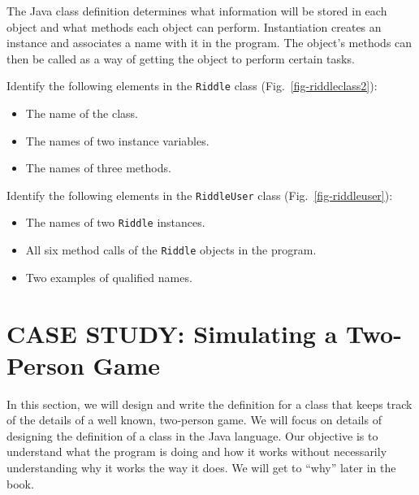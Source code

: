 \noindent The Java class definition determines what
information will be stored in each object and what methods each object
can perform.  Instantiation creates an instance and associates a name
with it in the program.  The object's methods can then be called as a
way of getting the object to perform certain tasks.

\pagebreak
{}
\label{self-study-exercises}
\begin{SSTUDY}

\item
Identify the following elements in the {\tt Riddle} class
(Fig.~\ref{fig-riddleclass2}):

\begin{itemize}
\item  The name of the class.
\item  The names of two instance variables.
\item  The names of three methods.
\end{itemize}


\item
Identify the following elements in the {\tt RiddleUser} class
(Fig.~\ref{fig-riddleuser}):

\begin{itemize}
\item  The names of two {\tt Riddle} instances.
\item  All six method calls of the {\tt Riddle} objects in the program.
\item  Two examples of qualified names.
\end{itemize}

\end{SSTUDY}


\section{CASE STUDY: Simulating a Two-Person Game}
\label{casestudy-simulatinga-two-person-game}
\noindent In this section, we will design and write the definition
for a class that keeps track of the details of a well known, two-person
game. We will focus on details of designing the definition of a class
in the Java language.  Our objective is to understand what the program
is doing and how it works without necessarily understanding why it
works the way it does.  We will get to ``why'' later in the book.

